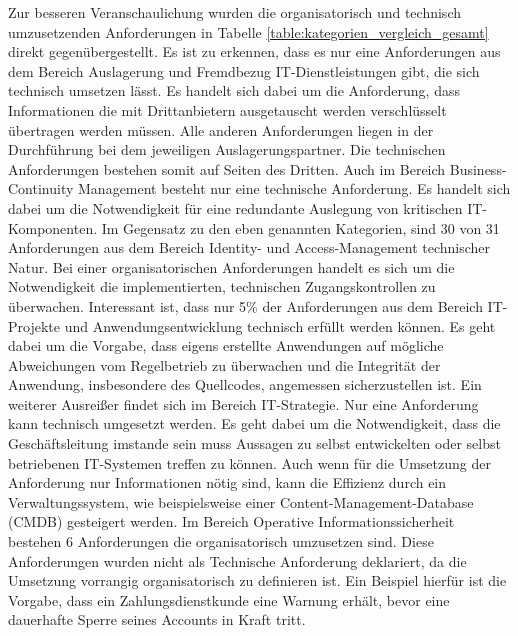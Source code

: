 Zur besseren Veranschaulichung wurden die organisatorisch und technisch umzusetzenden Anforderungen in Tabelle \ref{table:kategorien_vergleich_gesamt} direkt gegenübergestellt. Es ist zu erkennen, dass es nur eine Anforderungen aus dem Bereich \glqq{}Auslagerung und Fremdbezug IT-Dienstleistungen\grqq{} gibt, die sich technisch umsetzen lässt. Es handelt sich dabei um die Anforderung, dass Informationen die mit Drittanbietern ausgetauscht werden verschlüsselt übertragen werden müssen. Alle anderen Anforderungen liegen in der Durchführung bei dem jeweiligen Auslagerungspartner. Die technischen Anforderungen bestehen somit auf Seiten des Dritten. Auch im Bereich \glqq{}Business-Continuity Management\grqq{} besteht nur eine technische Anforderung. Es handelt sich dabei um die Notwendigkeit für eine redundante Auslegung von kritischen IT-Komponenten.
\bigbreak
Im Gegensatz zu den eben genannten Kategorien, sind 30 von 31 Anforderungen aus dem Bereich \glqq{}Identity- und Access-Management\grqq{} technischer Natur. Bei einer organisatorischen Anforderungen handelt es sich um die Notwendigkeit die implementierten, technischen Zugangskontrollen zu überwachen. Interessant ist, dass nur 5\% der Anforderungen aus dem Bereich \glqq{}IT-Projekte und Anwendungsentwicklung\grqq{} technisch erfüllt werden können. Es geht dabei um die Vorgabe, dass eigens erstellte Anwendungen auf mögliche Abweichungen vom Regelbetrieb zu überwachen und die Integrität der Anwendung, insbesondere des Quellcodes, angemessen sicherzustellen ist. 
\bigbreak
Ein weiterer Ausreißer findet sich im Bereich \glqq{}IT-Strategie\grqq{}. Nur eine Anforderung kann technisch umgesetzt werden. Es geht dabei um die Notwendigkeit, dass die Geschäftsleitung imstande sein muss Aussagen zu selbst entwickelten oder selbst betriebenen IT-Systemen treffen zu können. Auch wenn für die Umsetzung der Anforderung nur Informationen nötig sind, kann die Effizienz durch ein Verwaltungssystem, wie beispielsweise einer Content-Management-Database (CMDB) gesteigert werden. Im Bereich \glqq{}Operative Informationssicherheit\grqq{} bestehen 6 Anforderungen die organisatorisch umzusetzen sind. Diese Anforderungen wurden nicht als \glqq{}Technische Anforderung\grqq{} deklariert, da die Umsetzung vorrangig organisatorisch zu definieren ist. Ein Beispiel hierfür ist die Vorgabe, dass ein Zahlungsdienstkunde eine Warnung erhält, bevor eine dauerhafte Sperre seines Accounts in Kraft tritt.
\bigbreak

